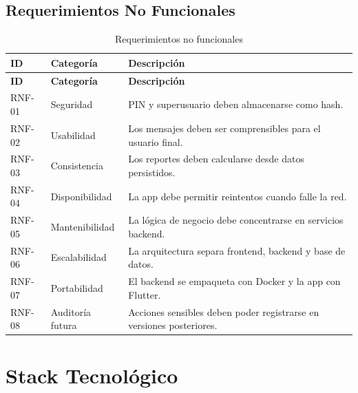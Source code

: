 \documentclass[11pt,letterpaper,openany]{report}
\begin{document}
\section{Requerimientos No Funcionales}

\begin{longtable}{p{}p{}p{}}
\caption{Requerimientos no funcionales}\\
\toprule
\textbf{ID} & \textbf{Categoría} & \textbf{Descripción}\\
\midrule
\endfirsthead
\toprule
\textbf{ID} & \textbf{Categoría} & \textbf{Descripción}\\
\midrule
\endhead
RNF-01 & Seguridad & PIN y superusuario deben almacenarse como hash.\\
RNF-02 & Usabilidad & Los mensajes deben ser comprensibles para el usuario final.\\
RNF-03 & Consistencia & Los reportes deben calcularse desde datos persistidos.\\
RNF-04 & Disponibilidad & La app debe permitir reintentos cuando falle la red.\\
RNF-05 & Mantenibilidad & La lógica de negocio debe concentrarse en servicios backend.\\
RNF-06 & Escalabilidad & La arquitectura separa frontend, backend y base de datos.\\
RNF-07 & Portabilidad & El backend se empaqueta con Docker y la app con Flutter.\\
RNF-08 & Auditoría futura & Acciones sensibles deben poder registrarse en versiones posteriores.\\
\bottomrule
\end{longtable}

\chapter{Stack Tecnológico}
\end{document}
